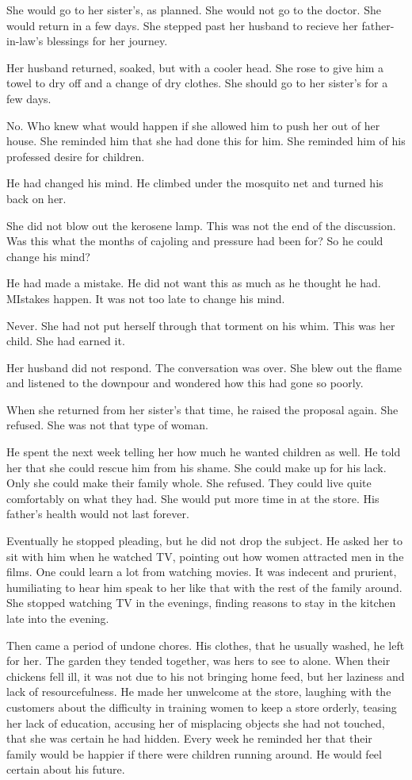 \documentclass{article}
\begin{document}
She would go to her sister's, as planned. She would not go to the doctor. She would return in a few days. She stepped past her husband to recieve her father-in-law's blessings for her journey.

Her husband returned, soaked, but with a cooler head. She rose to give him a towel to dry off and a change of dry clothes. She should go to her sister's for a few days.

No. Who knew what would happen if she allowed him to push her out of her house. She reminded him that she had done this for him. She reminded him of his professed desire for children. 

He had changed his mind. He climbed under the mosquito net and turned his back on her. 

She did not blow out the kerosene lamp. This was not the end of the discussion. Was this what the months of cajoling and pressure had been for? So he could change his mind?

He had made a mistake. He did not want this as much as he thought he had. MIstakes happen. It was not too late to change his mind. 

Never. She had not put herself through that torment on his whim. This was her child. She had earned it.

Her husband did not respond. The conversation was over. She blew out the flame and listened to the downpour and wondered how this had gone so poorly. 

When she returned from her sister's that time, he raised the proposal again. She refused. She was not that type of woman.

He spent the next week telling her how much he wanted children as well. He told her that she could rescue him from his shame. She could make up for his lack. Only she could make their family whole. She refused. They could live quite comfortably on what they had. She would put more time in at the store. His father's health would not last forever.

Eventually he stopped pleading, but he did not drop the subject. He asked her to sit with him when he watched TV, pointing out how women attracted men in the films. One could learn a lot from watching movies. It was indecent and prurient, humiliating to hear him speak to her like that with the rest of the family around. She stopped watching TV in the evenings, finding reasons to stay in the kitchen late into the evening.

Then came a period of undone chores. His clothes, that he usually washed, he left for her. The garden they tended together, was hers to see to alone. When their chickens fell ill, it was not due to his not bringing home feed, but her laziness and lack of resourcefulness. He made her unwelcome at the store, laughing with the customers about the difficulty in training women to keep a store orderly, teasing her lack of education, accusing her of misplacing objects she had not touched, that she was certain he had hidden. Every week he reminded her that their family would be happier if there were children running around. He would feel certain about his future. 
\end{document}

